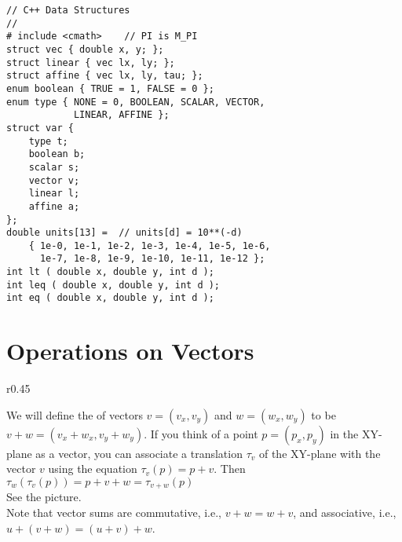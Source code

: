 \documentclass[12pt]{article}
\begin{document}
\bigskip

\hspace*{0.3in}\begin{minipage}{5.0in}
\begin{verbatim}
// C++ Data Structures
//
# include <cmath>    // PI is M_PI
struct vec { double x, y; };
struct linear { vec lx, ly; };
struct affine { vec lx, ly, tau; };
enum boolean { TRUE = 1, FALSE = 0 };
enum type { NONE = 0, BOOLEAN, SCALAR, VECTOR,
            LINEAR, AFFINE };
struct var {
    type t;
    boolean b;
    scalar s;
    vector v;
    linear l;
    affine a;
};
double units[13] =  // units[d] = 10**(-d)
    { 1e-0, 1e-1, 1e-2, 1e-3, 1e-4, 1e-5, 1e-6,
      1e-7, 1e-8, 1e-9, 1e-10, 1e-11, 1e-12 };
int lt ( double x, double y, int d );
int leq ( double x, double y, int d );
int eq ( double x, double y, int d );
\end{verbatim}
\end{minipage}

\section{Operations on Vectors}
\begin{minipage}{\textwidth}\raggedright
\begin{wrapfigure}{r}{0.45\textwidth}
\end{wrapfigure}
We will define the  of vectors $v=(v_x,v_y)$ and
$w=(w_x,w_y)$ to be $v+w=(v_x+w_x,v_y+w_y)$.  If you
think of a point $p=(p_x,p_y)$ in the XY-plane as a vector,
you can associate a translation $\tau_v$ of the XY-plane
with the vector $v$ using the equation $\tau_v(p)=p+v$.  Then\\
\hspace*{0.2in}$\tau_w(\tau_v(p)) = p+v+w = \tau_{v+w}(p)$ \\
See the picture.
\\[1ex]
Note that vector sums are commutative, i.e.,  $v+w=w+v$, and associative,
i.e., $u+(v+w)=(u+v)+w$.
\end{minipage}
\end{document}
